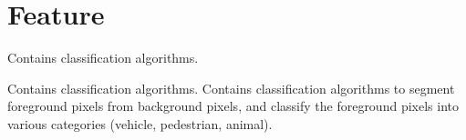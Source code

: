 \hypertarget{group___feature}{
\section{\-Feature}
\label{group___feature}
}


\-Contains classification algorithms.  


\-Contains classification algorithms. \-Contains classification algorithms to segment foreground pixels from background pixels, and classify the foreground pixels into various categories (vehicle, pedestrian, animal). 